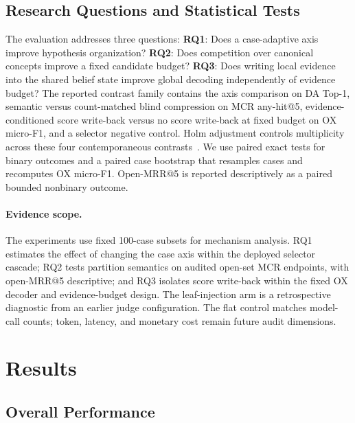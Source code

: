 \documentclass[letterpaper]{article} %
\begin{document}
\subsection{Research Questions and Statistical Tests}

The evaluation addresses three questions:
\textbf{RQ1}: Does a case-adaptive axis improve hypothesis organization?
\textbf{RQ2}: Does competition over canonical concepts improve a fixed candidate budget?
\textbf{RQ3}: Does writing local evidence into the shared belief state improve global decoding independently of evidence budget?
The reported contrast family contains the axis comparison on DA Top-1, semantic versus count-matched blind compression on MCR any-hit@5, evidence-conditioned score write-back versus no score write-back at fixed budget on OX micro-F1, and a selector negative control.
Holm adjustment controls multiplicity across these four contemporaneous contrasts~\cite{holm1979}.
We use paired exact tests for binary outcomes and a paired case bootstrap that resamples cases and recomputes OX micro-F1.
Open-MRR@5 is reported descriptively as a paired bounded nonbinary outcome.

\paragraph{Evidence scope.}
The experiments use fixed 100-case subsets for mechanism analysis.
RQ1 estimates the effect of changing the case axis within the deployed selector cascade; RQ2 tests partition semantics on audited open-set MCR endpoints, with open-MRR@5 descriptive; and RQ3 isolates score write-back within the fixed OX decoder and evidence-budget design.
The leaf-injection arm is a retrospective diagnostic from an earlier judge configuration.
The flat control matches model-call counts; token, latency, and monetary cost remain future audit dimensions.

\section{Results}
\label{sec:results}

\subsection{Overall Performance}
\label{sec:main-results}
\end{document}
